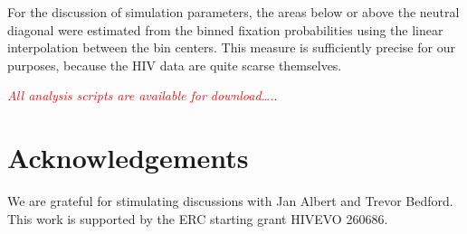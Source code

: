 \documentclass[rmp, twocolumn]{revtex4}
\newcommand{\comment}[1]{\textit{\textcolor{red}{#1}}}
\begin{document}
For the discussion of simulation parameters, the areas below or above the neutral
diagonal were estimated from the binned fixation probabilities using the linear
interpolation between the bin centers. This measure is sufficiently precise for
our purposes, because the HIV data are quite scarse themselves.

\comment{All analysis scripts are available for download\ldots.}. 
\section*{Acknowledgements}
We are grateful for stimulating discussions with Jan Albert and Trevor Bedford.
This work is supported by the ERC starting grant HIVEVO 260686.




\end{document}

